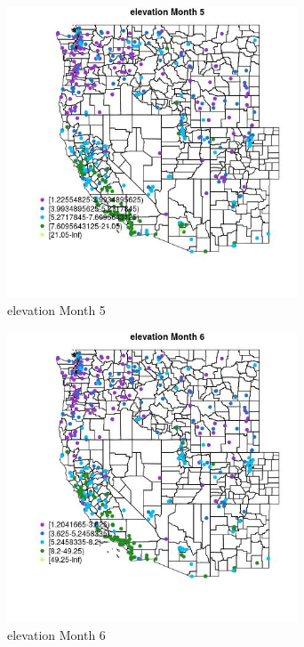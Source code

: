 \begin{figure} 
\centering  
\includegraphics[width=0.77\textwidth]{Code_Outputs/ML_input_report_ML_input_PM25_Step5_part_d_de_duplicated_aves_ML_input_MapObsMo5elevation.jpg} 
\caption{\label{fig:ML_input_report_ML_input_PM25_Step5_part_d_de_duplicated_aves_ML_inputMapObsMo5elevation}elevation Month 5} 
\end{figure} 
 

\begin{figure} 
\centering  
\includegraphics[width=0.77\textwidth]{Code_Outputs/ML_input_report_ML_input_PM25_Step5_part_d_de_duplicated_aves_ML_input_MapObsMo6elevation.jpg} 
\caption{\label{fig:ML_input_report_ML_input_PM25_Step5_part_d_de_duplicated_aves_ML_inputMapObsMo6elevation}elevation Month 6} 
\end{figure} 
 


